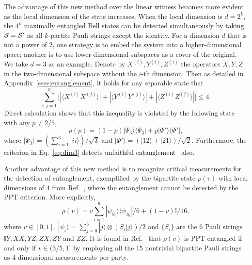 \documentclass[
12pt,
prx,
aps,
reprint,
a4paper,
longbibliograph,
nofootinbib,
nobibnotes,
superscriptaddress
]{revtex4-2}
\theoremstyle{definition}
\def\id{\mathbb{I}}%
\begin{document}
The advantage of this new method over the linear witness becomes more evident as the local dimension of the state increases.
When the local dimension is $d=2^k$, the $4^k$ maximally entangled Bell states can be detected simultaneously by taking ${\cal S}={\cal S}'$ as all $k$-partite Pauli strings except the identity. For a dimension $d$ that is not a power of $2$, one strategy is to embed the system into a higher-dimensional space; another is to use lower-dimensional subspaces as a cover of the original. We take $d=3$ as an example. Denote by $X^{(i)}, Y^{(i)}, Z^{(i)}$ the operators $X, Y, Z$ in the two-dimensional subspace without the $i$-th dimension. Then as detailed in Appendix~\ref{ssec:entanglement}, it holds for any separable state that
\begin{equation}
\label{eq:dim3}
    \sum_{i,j=1}^3 \big[ |\langle X^{(i)} X^{(j)}\rangle| + |\langle Y^{(i)} Y^{(j)}\rangle| + |\langle Z^{(i)} Z^{(j)}\rangle|\big] \le 4.
\end{equation}
Direct calculation shows that this inequality is violated by the following state with any $p\neq 2/5$, 
\begin{equation}
    \rho(p) = (1-p) |\Psi_3\rangle\langle \Psi_3| + p |\Phi'\rangle\langle \Phi'|,
\end{equation}
where $|\Psi_3\rangle = (\sum_{i=1}^3 |ii\rangle)/\sqrt{3}$ and $|\Phi'\rangle = (|12\rangle + |21\rangle)/\sqrt{2}$. Furthermore, the criterion in Eq.~\eqref{eq:dim3} detects unfaithful entanglement~\cite{Weilenmann2019EntanglementDB} also.

Another advantage of this new method is to recognize critical measurements for the detection of entanglement, exemplified by the bipartite state $\rho(v)$ with local dimensions of $4$ from Ref.~\cite{de2023uncertainty}, where the entanglement cannot be detected by the PPT criterion. More explicitly,
\begin{equation}\label{eq:rhov}
    \rho(v) = v\sum_{i=1}^6 |\psi_{S_i}\rangle\langle \psi_{S_i}|/6 + (1-v)\id/16,
\end{equation}
where $v\in [0,1]$, $|\psi_i\rangle = \sum_{j=0}^3 |j\rangle \otimes (S_i |j\rangle)/2$ and $\{S_i\}$ are the $6$ Pauli strings $\id Y, XX, YZ, ZX, ZY$ and $ZZ$. 
It is found in Ref.~\cite{de2023uncertainty} that $\rho(v)$ is PPT entangled if and only if $v\in (3/5,1]$ by employing all the $15$ nontrivial bipartite Pauli strings as $4$-dimensional measurements per party. 
\end{document}

